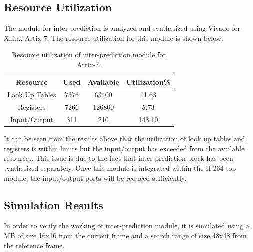 \subsection{Resource Utilization}
The module for inter-prediction is analyzed and synthesized using Vivado for Xilinx Artix-7. The resource utilization for this module is shown below.
\begin{table}[H]
	\centering
	\begin{tabular}{|c|c|c|c|} \hline
		\textbf{Resource} & \textbf{Used} & \textbf{Available} & \textbf{Utilization\%}  \\ \hline
		Look Up Tables & 7376 & 63400 & 11.63 \\ \hline
		Registers & 7266 & 126800 & 5.73 \\ \hline
		Input/Output & 311 & 210 & 148.10 \\ \hline 
	\end{tabular}
	\caption{Resource utilization of inter-prediction module for Artix-7.}
	\label{tab:resource_me}
\end{table}

It can be seen from the results above that the utilization of look up tables and registers is within limits but the input/output has exceeded from the available resources. This issue is due to the fact that inter-prediction block has been synthesized separately. Once this module is integrated within the H.264 top module, the input/output ports will be reduced sufficiently.  

\subsection{Simulation Results}
In order to verify the working of inter-prediction module, it is simulated using a MB of size 16x16 from the current frame and a search range of size 48x48 from the reference frame.

